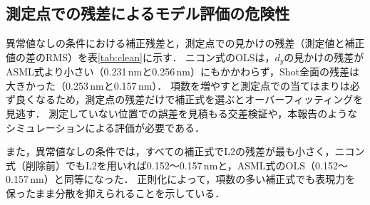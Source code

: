 \documentclass[11pt,a4paper]{ltjsarticle}
\begin{document}
\subsection{測定点での残差によるモデル評価の危険性}

異常値なしの条件における補正残差と，測定点での見かけの残差（測定値と補正値の差のRMS）を表\ref{tab:clean}に示す．
ニコン式のOLSは，$d_y$の見かけの残差がASML式より小さい（0.231\,nmと0.256\,nm）にもかかわらず，Shot全面の残差は大きかった（0.253\,nmと0.157\,nm）．
項数を増やすと測定点での当てはまりは必ず良くなるため，測定点の残差だけで補正式を選ぶとオーバーフィッティングを見逃す．
測定していない位置での誤差を見積もる交差検証\cite{Ehrlich2025}や，本報告のようなシミュレーションによる評価が必要である．

また，異常値なしの条件では，すべての補正式でL2の残差が最も小さく，ニコン式（削除前）でもL2を用いれば0.152〜0.157\,nmと，ASML式のOLS（0.152〜0.157\,nm）と同等になった．
正則化によって，項数の多い補正式でも表現力を保ったまま分散を抑えられることを示している．
\end{document}
